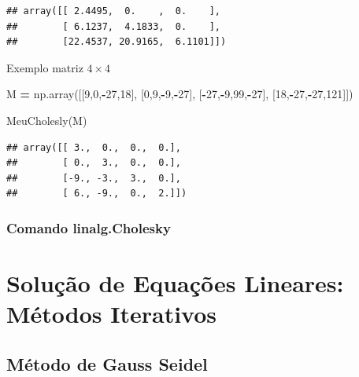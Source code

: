 \documentclass[
]{book}
\newenvironment{Shaded}{\begin{snugshade}}{\end{snugshade}}
\newcommand{\DecValTok}[1]{\textcolor[rgb]{0.00,0.00,0.81}{#1}}
\newcommand{\NormalTok}[1]{#1}
\newcommand{\OperatorTok}[1]{\textcolor[rgb]{0.81,0.36,0.00}{\textbf{#1}}}
\begin{document}
\begin{verbatim}
## array([[ 2.4495,  0.    ,  0.    ],
##        [ 6.1237,  4.1833,  0.    ],
##        [22.4537, 20.9165,  6.1101]])
\end{verbatim}

Exemplo matriz \(4 \times 4\)

\begin{Shaded}
\begin{Highlighting}[]
\NormalTok{M }\OperatorTok{=}\NormalTok{ np.array([[}\DecValTok{9}\NormalTok{,}\DecValTok{0}\NormalTok{,}\OperatorTok{{-}}\DecValTok{27}\NormalTok{,}\DecValTok{18}\NormalTok{],}
\NormalTok{              [}\DecValTok{0}\NormalTok{,}\DecValTok{9}\NormalTok{,}\OperatorTok{{-}}\DecValTok{9}\NormalTok{,}\OperatorTok{{-}}\DecValTok{27}\NormalTok{],}
\NormalTok{              [}\OperatorTok{{-}}\DecValTok{27}\NormalTok{,}\OperatorTok{{-}}\DecValTok{9}\NormalTok{,}\DecValTok{99}\NormalTok{,}\OperatorTok{{-}}\DecValTok{27}\NormalTok{],}
\NormalTok{              [}\DecValTok{18}\NormalTok{,}\OperatorTok{{-}}\DecValTok{27}\NormalTok{,}\OperatorTok{{-}}\DecValTok{27}\NormalTok{,}\DecValTok{121}\NormalTok{]])}

\NormalTok{MeuCholesly(M)}
\end{Highlighting}
\end{Shaded}

\begin{verbatim}
## array([[ 3.,  0.,  0.,  0.],
##        [ 0.,  3.,  0.,  0.],
##        [-9., -3.,  3.,  0.],
##        [ 6., -9.,  0.,  2.]])
\end{verbatim}

\hypertarget{comando-linalg.cholesky}{%
\subsubsection{Comando linalg.Cholesky}\label{comando-linalg.cholesky}}

\hypertarget{soluuxe7uxe3o-de-equauxe7uxf5es-lineares-muxe9todos-iterativos}{%
\section{Solução de Equações Lineares: Métodos Iterativos}\label{soluuxe7uxe3o-de-equauxe7uxf5es-lineares-muxe9todos-iterativos}}

\hypertarget{muxe9todo-de-gauss-seidel}{%
\subsection{Método de Gauss Seidel}\label{muxe9todo-de-gauss-seidel}}
\end{document}
